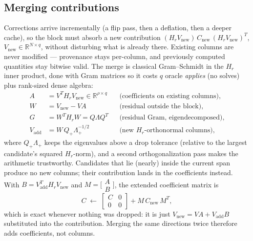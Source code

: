 \documentclass[11pt]{article}
\newcommand{\Hr}{H_r}
\newcommand{\R}{\mathbb{R}}
\begin{document}
\subsection{Merging contributions}
\label{sec:merge}

Corrections arrive incrementally (a flip pass, then a deflation, then a
deeper cache), so the block must absorb a new contribution
$(\Hr V_{\mathrm{new}})\, C_{\mathrm{new}}\, (\Hr V_{\mathrm{new}})^T$,
$V_{\mathrm{new}} \in \R^{N \times q}$, without disturbing what is already
there. Existing columns are never modified --- provenance stays
per-column, and previously computed quantities stay bitwise valid. The
merge is classical Gram--Schmidt in the $\Hr$ inner product, done with
Gram matrices so it costs $q$ oracle \emph{applies} (no solves) plus
rank-sized dense algebra:
\begin{align}
  A &= V^T \Hr V_{\mathrm{new}} \in \R^{\rho \times q}
      &&\text{(coefficients on existing columns),} \nonumber\\
  W &= V_{\mathrm{new}} - V A
      &&\text{(residual outside the block),} \nonumber\\
  G &= W^T \Hr W = Q \Lambda Q^T
      &&\text{(residual Gram, eigendecomposed),} \nonumber\\
  V_{\mathrm{add}} &= W\, Q_+ \Lambda_+^{-1/2}
      &&\text{(new $\Hr$-orthonormal columns),}
  \label{eq:merge}
\end{align}
where $Q_+ \Lambda_+$ keeps the eigenvalues above a drop tolerance
(relative to the largest candidate's squared $\Hr$-norm), and a second
orthogonalization pass makes the arithmetic trustworthy. Candidates that
lie (nearly) inside the current span produce no new columns; their
contribution lands in the coefficients instead. With
$B = V_{\mathrm{add}}^T \Hr V_{\mathrm{new}}$ and
$M = \bigl[\begin{smallmatrix} A \\ B \end{smallmatrix}\bigr]$, the
extended coefficient matrix is
\begin{equation}
  C \;\longleftarrow\;
  \begin{bmatrix} C & 0 \\ 0 & 0 \end{bmatrix}
  + M\, C_{\mathrm{new}}\, M^T ,
  \label{eq:merge-coeffs}
\end{equation}
which is exact whenever nothing was dropped: it is just
$V_{\mathrm{new}} = V A + V_{\mathrm{add}} B$ substituted into the
contribution. Merging the same directions twice therefore adds
coefficients, not columns.
\end{document}
